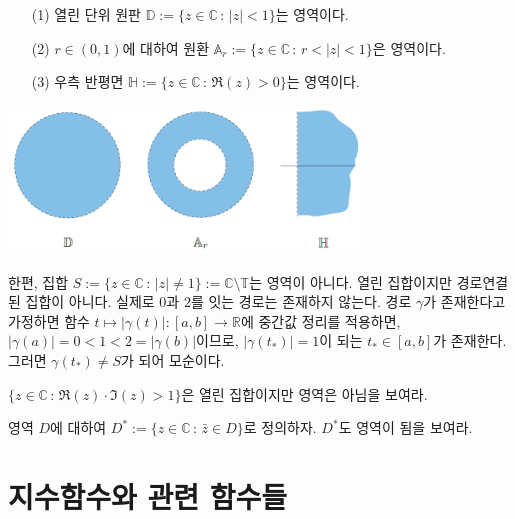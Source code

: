 \begin{saltexample}[label=example-1-3]{}{}

\begin{itemize}
\item[(1)] 열린 단위 원판 $\mathbb D := \{ z\in\mathbb C\,:\, |z|<1 \}$는 영역이다.
\item[(2)] $r\in (0,1)$에 대하여 원환 $\mathbb A_r := \{ z\in\mathbb C\,:\, r<|z|<1\}$은 영역이다.
\item[(3)] 우측 반평면 $\mathbb H := \{ z\in \mathbb C \,:\, \Re(z)>0\}$는 영역이다.
\end{itemize}

\begin{center}
\includegraphics[width=0.7\textwidth]{./SaltChapter/figs/fig-1-12}
\end{center}
\label{fig-1-12}
\end{saltexample}

한편, 집합 $S:=\{z\in\mathbb C \,:\, |z|\ne 1\} := \mathbb C\setminus \mathbb T$는 
영역이 아니다. 열린 집합이지만 경로연결된 집합이 아니다.
실제로 $0$과 $2$를 잇는 경로는 존재하지 않는다.
경로 $\gamma$가 존재한다고 가정하면
함수 $t\mapsto |\gamma(t)| : [a,b] \to \mathbb R$에
중간값 정리를 적용하면,
$|\gamma(a)| = 0 < 1<2 = |\gamma(b)|$이므로,
$|\gamma(t_*)|=1$이 되는 $t_*\in [a,b]$가 존재한다.
그러면 $\gamma(t_*)\ne S$가 되어 모순이다.

\begin{salt_exercise} \label{ex-1-29}
$\{z\in \mathbb C \,:\, \Re(z) \cdot \Im(z) >1\}$은 열린 집합이지만
영역은 아님을 보여라.
\end{salt_exercise}

\begin{salt_exercise} \label{ex-1-30}
영역 $D$에 대하여
$D^*:= \{z\in\mathbb C\,:\, \bar z \in D\}$로 정의하자.
$D^*$도 영역이 됨을 보여라.
\end{salt_exercise}

\section{지수함수와 관련 함수들}


